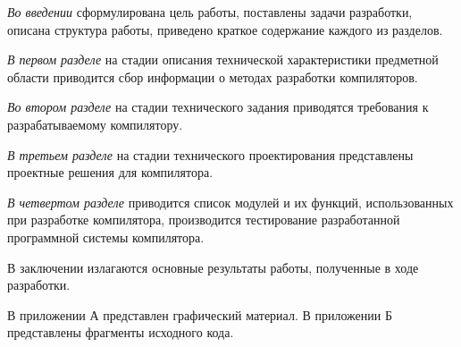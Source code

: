 \emph{Во введении} сформулирована цель работы, поставлены задачи разработки, описана структура работы, приведено краткое содержание каждого из разделов.

\emph{В первом разделе} на стадии описания технической характеристики предметной области приводится сбор информации о методах разработки компиляторов.

\emph{Во втором разделе} на стадии технического задания приводятся требования к разрабатываемому компилятору.

\emph{В третьем разделе} на стадии технического проектирования представлены проектные решения для компилятора.

\emph{В четвертом разделе} приводится список модулей и их функций, использованных при разработке компилятора, производится тестирование разработанной программной системы компилятора.

В заключении излагаются основные результаты работы, полученные в ходе разработки.

В приложении А представлен графический материал.
В приложении Б представлены фрагменты исходного кода. 
